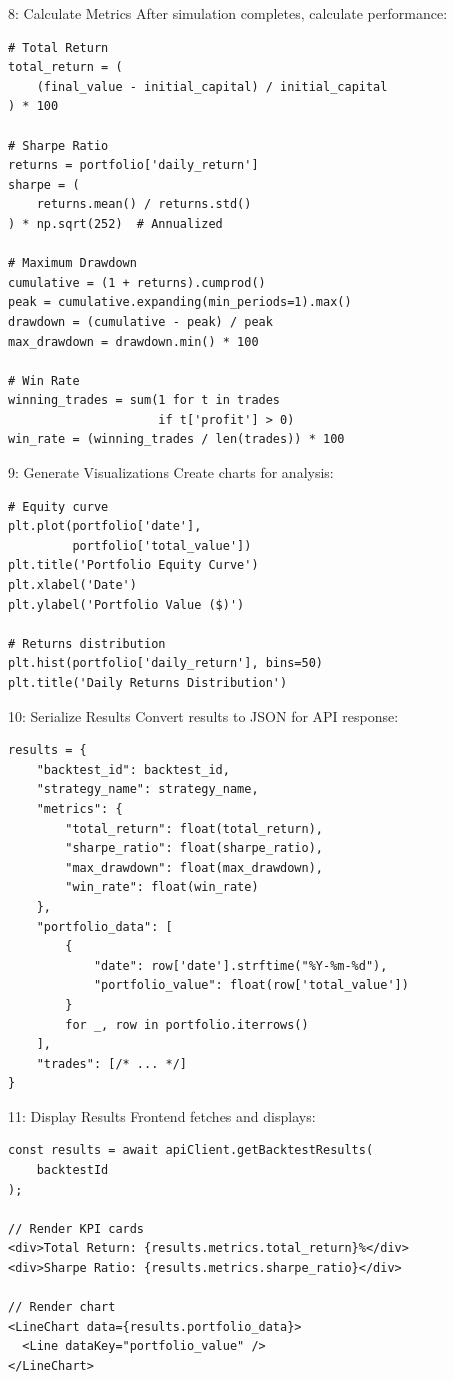 \documentclass[11pt,a4paper]{article}
\begin{document}
\begin{flowstep}{8: Calculate Metrics}
After simulation completes, calculate performance:
\begin{lstlisting}[style=pythoncode]
# Total Return
total_return = (
    (final_value - initial_capital) / initial_capital
) * 100

# Sharpe Ratio
returns = portfolio['daily_return']
sharpe = (
    returns.mean() / returns.std()
) * np.sqrt(252)  # Annualized

# Maximum Drawdown
cumulative = (1 + returns).cumprod()
peak = cumulative.expanding(min_periods=1).max()
drawdown = (cumulative - peak) / peak
max_drawdown = drawdown.min() * 100

# Win Rate
winning_trades = sum(1 for t in trades 
                     if t['profit'] > 0)
win_rate = (winning_trades / len(trades)) * 100
\end{lstlisting}
\end{flowstep}

\begin{flowstep}{9: Generate Visualizations}
Create charts for analysis:
\begin{lstlisting}[style=pythoncode]
# Equity curve
plt.plot(portfolio['date'], 
         portfolio['total_value'])
plt.title('Portfolio Equity Curve')
plt.xlabel('Date')
plt.ylabel('Portfolio Value ($)')

# Returns distribution
plt.hist(portfolio['daily_return'], bins=50)
plt.title('Daily Returns Distribution')
\end{lstlisting}
\end{flowstep}

\begin{flowstep}{10: Serialize Results}
Convert results to JSON for API response:
\begin{lstlisting}[style=pythoncode]
results = {
    "backtest_id": backtest_id,
    "strategy_name": strategy_name,
    "metrics": {
        "total_return": float(total_return),
        "sharpe_ratio": float(sharpe_ratio),
        "max_drawdown": float(max_drawdown),
        "win_rate": float(win_rate)
    },
    "portfolio_data": [
        {
            "date": row['date'].strftime("%Y-%m-%d"),
            "portfolio_value": float(row['total_value'])
        }
        for _, row in portfolio.iterrows()
    ],
    "trades": [/* ... */]
}
\end{lstlisting}
\end{flowstep}

\begin{flowstep}{11: Display Results}
Frontend fetches and displays:
\begin{lstlisting}[style=pythoncode]
const results = await apiClient.getBacktestResults(
    backtestId
);

// Render KPI cards
<div>Total Return: {results.metrics.total_return}%</div>
<div>Sharpe Ratio: {results.metrics.sharpe_ratio}</div>

// Render chart
<LineChart data={results.portfolio_data}>
  <Line dataKey="portfolio_value" />
</LineChart>
\end{lstlisting}
\end{flowstep}
\end{document}
